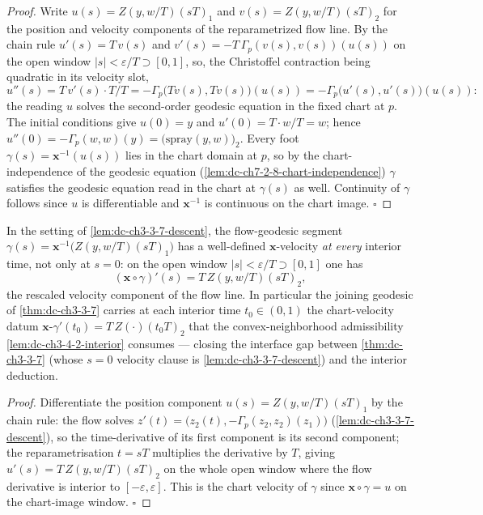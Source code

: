 \begin{proof}
  \leanok
  Write $u(s)=Z(y,w/T)(sT)_1$ and $v(s)=Z(y,w/T)(sT)_2$ for the position and
  velocity components of the reparametrized flow line. By the chain rule
  $u'(s)=T\,v(s)$ and $v'(s)=-T\,\Gamma_p(v(s),v(s))(u(s))$ on the open window
  $|s|<\varepsilon/T\supset[0,1]$, so, the Christoffel contraction being
  quadratic in its velocity slot,
  $$
  u''(s)=T\,v'(s)\cdot T/T=-\Gamma_p\bigl(T v(s),T v(s)\bigr)(u(s))
    =-\Gamma_p\bigl(u'(s),u'(s)\bigr)(u(s)):
  $$
  the reading $u$ solves the second-order geodesic equation in the fixed chart
  at $p$. The initial conditions give $u(0)=y$ and $u'(0)=T\cdot w/T=w$; hence
  $u''(0)=-\Gamma_p(w,w)(y)=\bigl(\mathrm{spray}(y,w)\bigr)_2$. Every
  foot $\gamma(s)=\mathbf{x}^{-1}(u(s))$ lies in the chart domain at $p$, so by
  the chart-independence of the geodesic equation
  (\cref{lem:dc-ch7-2-8-chart-independence}) $\gamma$ satisfies the geodesic
  equation read in the chart at $\gamma(s)$ as well. Continuity of $\gamma$
  follows since $u$ is differentiable and $\mathbf{x}^{-1}$ is continuous on the
  chart image. $\square$
\end{proof}

\begin{lemma}
  \label{lem:dc-ch3-3-7-descent-velocity}
  \leanok
  In the setting of \cref{lem:dc-ch3-3-7-descent}, the flow-geodesic segment
  $\gamma(s)=\mathbf{x}^{-1}\bigl(Z(y,w/T)(sT)_1\bigr)$ has a well-defined
  $\mathbf{x}$-velocity \emph{at every} interior time, not only at $s=0$: on the
  open window $|s|<\varepsilon/T\supset[0,1]$ one has
  $$
  (\mathbf{x}\circ\gamma)'(s)=T\,Z(y,w/T)(sT)_2,
  $$
  the rescaled velocity component of the flow line. In particular the joining
  geodesic of \cref{thm:dc-ch3-3-7} carries at each interior time $t_0\in(0,1)$ the
  chart-velocity datum $\mathbf{x}$-$\gamma'(t_0)=T\,Z(\cdot)(t_0T)_2$ that the
  convex-neighborhood admissibility \cref{lem:dc-ch3-4-2-interior} consumes —
  closing the interface gap between \cref{thm:dc-ch3-3-7} (whose $s=0$ velocity
  clause is \cref{lem:dc-ch3-3-7-descent}) and the interior deduction.
\end{lemma}
\begin{proof}
  \leanok
  Differentiate the position component $u(s)=Z(y,w/T)(sT)_1$ by the chain rule:
  the flow solves $z'(t)=\bigl(z_2(t),-\Gamma_p(z_2,z_2)(z_1)\bigr)$
  (\cref{lem:dc-ch3-3-7-descent}), so the time-derivative of its first component
  is its second component; the reparametrisation $t=sT$ multiplies the derivative
  by $T$, giving $u'(s)=T\,Z(y,w/T)(sT)_2$ on the whole open window where the flow
  derivative is interior to $[-\varepsilon,\varepsilon]$. This is the chart velocity
  of $\gamma$ since $\mathbf{x}\circ\gamma=u$ on the chart-image window. $\square$
\end{proof}

